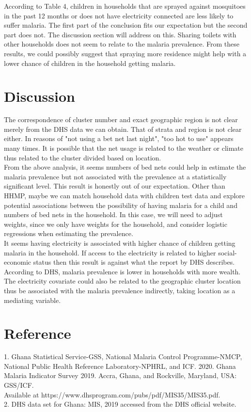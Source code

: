 \documentclass[11pt]{article}
\begin{document}
According to Table 4, children in households that are sprayed against mosquitoes in the past 12 months or does not have electricity connected are less likely to suffer malaria. The first part of the conclusion fits our expectation but the second part does not. The discussion section will address on this. Sharing toilets with other households does not seem to relate to the malaria prevalence. From these results, we could possibly suggest that spraying more residence might help with a lower chance of children in the household getting malaria. 

\section{Discussion}

The correspondence of cluster number and exact geographic region is not clear merely from the DHS data we can obtain. That of strata and region is not clear either. In reasons of "not using a bet net last night", "too hot to use" appears many times. It is possible that the net usage is related to the weather or climate thus related to the cluster divided based on location. \\
From the above analysis, it seems numbers of bed nets could help in estimate the malaria prevalence but not associated with the prevalence at a statistically significant level. This result is honestly out of our expectation. Other than HHMP, maybe we can match household data with children test data and explore potential associations between the possibility of having malaria for a child and numbers of bed nets in the household. In this case, we will need to adjust weights, since we only have weights for the household, and consider logistic regressions when estimating the prevalence. \\
It seems having electricity is associated with higher chance of children getting malaria in the household. If access to the electricity is related to higher social-economic status then this result is against what the report by DHS describes. According to DHS, malaria prevalence is lower in households with more wealth. The electricity covariate could also be related to the geographic cluster location thus be associated with the malaria prevalence indirectly, taking location as a mediating variable. 

\section*{Reference}

1. Ghana Statistical Service-GSS, National Malaria Control Programme-NMCP, National Public Health Reference Laboratory-NPHRL, and ICF. 2020. Ghana Malaria Indicator Survey 2019. Accra, Ghana, and Rockville, Maryland, USA: GSS/ICF. \\ Available at https://www.dhsprogram.com/pubs/pdf/MIS35/MIS35.pdf. \\
2. DHS data set for Ghana: MIS, 2019 accessed from the DHS official website. 
\end{document}

